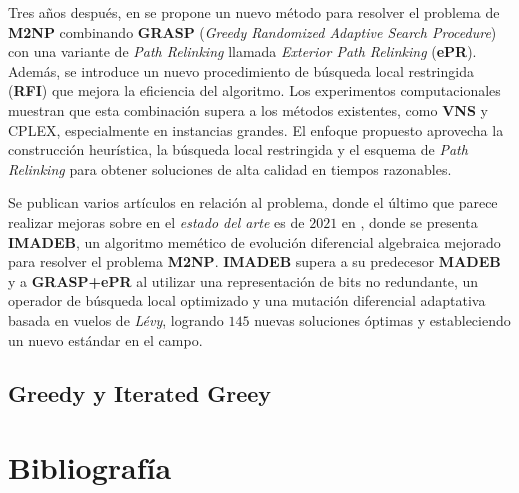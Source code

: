 \documentclass[12pt,letterpaper]{article}
\begin{document}
Tres años después, en \cite{RODRIGUEZ2017243} se propone un nuevo método para resolver el problema de \textbf{M2NP} combinando \textbf{GRASP} (\textit{Greedy Randomized Adaptive Search Procedure}) con una variante de \textit{Path Relinking} llamada  \textit{Exterior Path Relinking} (\textbf{ePR}). Además, se introduce un nuevo procedimiento de búsqueda local restringida (\textbf{RFI}) que mejora la eficiencia del algoritmo. Los experimentos computacionales muestran que esta combinación supera a los métodos existentes, como \textbf{VNS} y CPLEX, especialmente en instancias grandes. El enfoque propuesto aprovecha la construcción heurística, la búsqueda local restringida y el esquema de \textit{Path Relinking} para obtener soluciones de alta calidad en tiempos razonables.

Se publican varios artículos en relación al problema, donde el último que parece realizar mejoras sobre en el \textit{estado del arte} es de $2021$ en \cite{SANTUCCI2021114938}, donde se presenta \textbf{IMADEB}, un algoritmo memético de evolución diferencial algebraica mejorado para resolver el problema \textbf{M2NP}. \textbf{IMADEB} supera a su predecesor \textbf{MADEB} y a \textbf{GRASP+ePR} al utilizar una representación de bits no redundante, un operador de búsqueda local optimizado y una mutación diferencial adaptativa basada en vuelos de \textit{Lévy}, logrando $145$ nuevas soluciones óptimas y estableciendo un nuevo estándar en el campo.

\subsection{Greedy y Iterated Greey}

\newpage
\section{Bibliografía}

\printbibliography[heading=none, category=cited]
\end{document}
